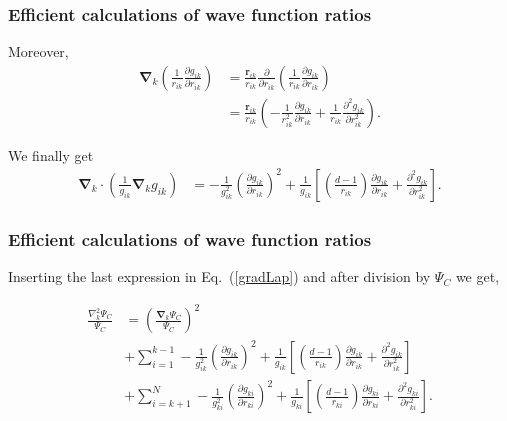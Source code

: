 \documentclass[compress]{beamer}
\newcommand{\bfv}[1]{\boldsymbol{#1}}                     %
\begin{document}
\frame
 {
   \frametitle{Efficient calculations of wave function ratios}
 \begin{small}
 {\scriptsize

Moreover, 
\begin{align*}
\bfv{\nabla}_k \left(\frac{1}{r_{ik}}\frac{\partial g_{ik}}{\partial r_{ik}}\right) &= \frac{\bfv{r}_{ik}}{r_{ik}} \frac{\partial }{\partial r_{ik}} \left(\frac{1}{r_{ik}}\frac{\partial g_{ik}}{\partial r_{ik}}\right)\nonumber\\
&=\frac{\bfv{r}_{ik}}{r_{ik}}\left(-\frac{1}{r_{ik}^2}\frac{\partial g_{ik}}{\partial r_{ik}} + \frac{1}{r_{ik}}\frac{\partial^2 g_{ik}}{\partial r_{ik}^2}\right).\label{subs1}
\end{align*}

We finally get
\begin{align*}
  \bfv{\nabla}_k \cdot \left(\frac{1}{g_{ik}}\bfv{\nabla}_k g_{ik}\right) &= -\frac{1}{g_{ik}^2}\left(\frac{\partial g_{ik}}{\partial r_{ik}}\right)^2 + \frac{1}{g_{ik}}\left[\left(\frac{d-1}{r_{ik}}\right)\frac{\partial g_{ik}}{\partial r_{ik}} + \frac{\partial^2 g_{ik}}{\partial r_{ik}^2} \right].
\end{align*}
 }
 \end{small}
 }
\frame
 {
   \frametitle{Efficient calculations of wave function ratios}
 \begin{small}
 {\scriptsize

Inserting the last expression in Eq.~(\ref{gradLap}) and after division by $\Psi_C$ we get,

\begin{align}
 \frac{\nabla_{k}^2 \Psi_C}{\Psi_C} & =  \left(\frac{\bfv{\nabla}_k \Psi_C}{\Psi_C}\right)^2 \nonumber\\
 & + \sum_{i=1}^{k-1} -\frac{1}{g_{ik}^2}\left(\frac{\partial g_{ik}}{\partial r_{ik}}\right)^2 + \frac{1}{g_{ik}}\left[\left(\frac{d-1}{r_{ik}}\right)\frac{\partial g_{ik}}{\partial r_{ik}} + \frac{\partial^2 g_{ik}}{\partial r_{ik}^2} \right]\nonumber\\
 & + \sum_{i=k+1}^{N} -\frac{1}{g_{ki}^2}\left(\frac{\partial g_{ki}}{\partial r_{ki}}\right)^2 + \frac{1}{g_{ki}}\left[\left(\frac{d-1}{r_{ki}}\right)\frac{\partial g_{ki}}{\partial r_{ki}} + \frac{\partial^2 g_{ki}}{\partial r_{ki}^2} \right].
\end{align}
 }
 \end{small}
 }
\frame
\end{document}
